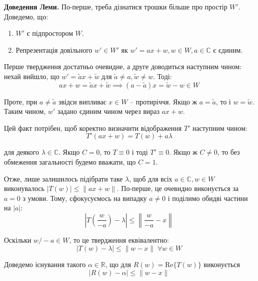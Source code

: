 \documentclass[14pt]{extarticle}
\newcommand{\<}{\langle}
\renewcommand{\>}{\rangle}
\theoremstyle{mystyle}{\newtheorem{definition}{Definition}[section]}
\theoremstyle{mystyle}{\newtheorem{proposition}[definition]{Proposition}}
\theoremstyle{mystyle}{\newtheorem{theorem}[definition]{Theorem}}
\theoremstyle{mystyle}{\newtheorem{lemma}[definition]{Lemma}}
\theoremstyle{mystyle}{\newtheorem{corollary}[definition]{Corollary}}
\theoremstyle{mystyle}{\newtheorem*{remark}{Remark}}
\theoremstyle{mystyle}{\newtheorem*{remarks}{Remarks}}
\theoremstyle{mystyle}{\newtheorem*{example}{Example}}
\theoremstyle{mystyle}{\newtheorem*{examples}{Examples}}
\theoremstyle{definition}{\newtheorem*{exercise}{Exercise}}
\theoremstyle{cstyle}{\newtheorem*{cthm}{}}
\theoremstyle{warn}
\begin{document}
\textbf{Доведення Леми.} По-перше, треба дізнатися трошки більше про простір $W'$. Доведемо, що:
\begin{enumerate}
    \item $W'$ є підпростором $W$.
    \item Репрезентація довільного $w' \in W'$ як $w'=ax+w, w \in W, a \in \mathbb{C}$ є єдиним.
\end{enumerate}

Перше твердження достатньо очевидне, а друге доводиться наступним чином: нехай вийшло, що $w'=\widetilde{a}x+\widetilde{w}$ для $\widetilde{a}\neq a,\widetilde{w} \neq w$. Тоді:
\begin{equation}
    ax+w = \widetilde{a}x+\widetilde{w} \implies (a-\widetilde{a})x = \widetilde{w}-w \in W
\end{equation}

Проте, при $a \neq \widetilde{a}$ звідси випливає $x \in W$ -- протиріччя. Якщо ж $a=\widetilde{a}$, то і $w=\widetilde{w}$. Таким чином, $w'$ задано єдиним чином через вираз $ax+w$.

Цей факт потрібен, щоб коректно визначити відображення $T'$ наступним чином:
\begin{equation}
    T'(ax+w) = T(w) + a\lambda
\end{equation}

для деякого $\lambda \in \mathbb{C}$. Якщо $C=0$, то $T \equiv 0$ і тоді $T' \equiv 0$. Якщо ж $C \neq 0$, то без обмеження загальності будемо вважати, що $C=1$.

Отже, лише залишилось підібрати таке $\lambda$, щоб для всіх $a \in \mathbb{C}, w \in W$ виконувалось $|T(w)| \leq \|ax+w\|$. По-перше, це очевидно виконується за $a=0$ з умови. Тому, сфокусуємось на випадку $a \neq 0$ і поділимо обидві частини на $|a|$:
\begin{equation}
    \left|T\left(\frac{w}{-a}\right)-\lambda\right| \leq \left\|\frac{w}{-a} - x\right\|
\end{equation}

Оскільки $w/-a \in W$, то це твердження еквівалентно:
\begin{equation}
    |T(w)-\lambda| \leq \|w-x\| \; \forall w \in W
\end{equation}

Доведемо існування такого $\alpha \in \mathbb{R}$, що для $R(w) = \text{Re}\{T(w)\}$ виконується
\begin{equation}
    |R(w)-\alpha| \leq \|w-x\|
\end{equation}
\end{document}
